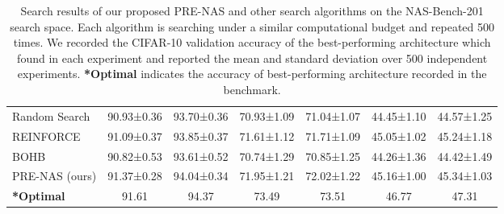 \documentclass[sigconf]{acmart}
\begin{document}
\begin{table*}[!h]
\begin{tabular}{l|c|c|c|c|c|c}
Random Search \cite{Ref:65}                                      & 90.93±0.36                     & 93.70±0.36                    & 70.93±1.09                     & 71.04±1.07                     & 44.45±1.10                        & 44.57±1.25                        \\
REINFORCE \cite{Ref:01}                              & 91.09±0.37                     & 93.85±0.37                    & 71.61±1.12                     & 71.71±1.09                     & 45.05±1.02                        & 45.24±1.18                        \\
BOHB \cite{Ref:66}                                    & 90.82±0.53                     & 93.61±0.52                    & 70.74±1.29                     & 70.85±1.25                     & 44.26±1.36                        & 44.42±1.49                        \\ \hline
PRE-NAS (ours)                                 & {91.37±0.28}                     & {94.04±0.34}                    & {71.95±1.21}                     & {72.02±1.22}                     & {45.16±1.00}                        & {45.34±1.03}                        \\\hline
\textbf{*Optimal}                        & 91.61                          & 94.37                         & 73.49                          & 73.51                          & 46.77                             & 47.31                             \\ \hline
\end{tabular}
\caption{Search results of our proposed PRE-NAS and other search algorithms on the NAS-Bench-201 search space. Each algorithm is searching under a similar computational budget and repeated 500 times. We recorded the CIFAR-10 validation accuracy of the best-performing architecture which found in each experiment and reported the mean and standard deviation over 500 independent experiments. \textbf{*Optimal} indicates the accuracy of best-performing architecture recorded in the benchmark.}
\label{nasbench201results}
\end{table*}
\end{document}
